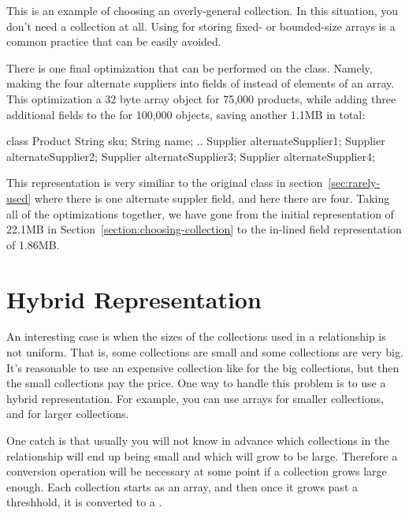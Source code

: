 This is an example of choosing an overly-general collection. In
this situation, you don't need a collection at all. Using 
for storing fixed- or bounded-size arrays is a
common practice that can be easily avoided.

There is one final optimization that can be performed on the 
class. Namely, making the four alternate suppliers into fields of
 instead of elements of an array. This optimization
 a 32 byte array object for 75,000 products, while adding three additional
 fields to the  for 100,000 objects, saving another 1.1MB in
 total:
\begin{shortlisting}
class Product {
	String sku;
	String name;
	.. 
	Supplier alternateSupplier1;
	Supplier alternateSupplier2;
	Supplier alternateSupplier3;
	Supplier alternateSupplier4;
}
\end{shortlisting}

This representation is very similiar to the original  class in
section~\ref{sec:rarely-used} where there is one alternate suppler field, and
here there are four. Taking all of the optimizations 
together, we have gone from the initial  representation
of 22.1MB in Section~\ref{section:choosing-collection} to the in-lined field
representation of 1.86MB. 

\section{Hybrid Representation}

An interesting case is when the sizes of the collections used in a relationship
is not uniform. That is, some collections are small and some collections are
very big.  It's reasonable to use an expensive collection like 
for the big collections, but then the small collections pay the price. One way
to handle this problem is to use a hybrid representation. For example, you can
use arrays for smaller collections, and  for larger
collections. 

One catch is that usually you will not know in advance which collections in the
relationship will end up being small and which will grow to be large. Therefore
a conversion operation will be necessary at some point if a collection grows
large enough. Each collection starts as an array, and then once it
grows past a threshhold, it is converted to a .

